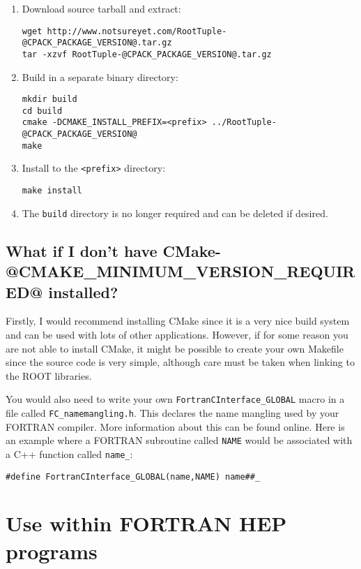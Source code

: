 \documentclass[a4paper,12pt]{article}
\begin{document}
\begin{enumerate}
    \item Download source tarball and extract:\begin{verbatim}
wget http://www.notsureyet.com/RootTuple-@CPACK_PACKAGE_VERSION@.tar.gz
tar -xzvf RootTuple-@CPACK_PACKAGE_VERSION@.tar.gz\end{verbatim}
    \item Build in a separate binary directory:\begin{verbatim}
mkdir build
cd build
cmake -DCMAKE_INSTALL_PREFIX=<prefix> ../RootTuple-@CPACK_PACKAGE_VERSION@
make\end{verbatim}
    \item Install to the \verb|<prefix>| directory:\begin{verbatim}
make install\end{verbatim}
    \item The \verb|build| directory is no longer required and can be deleted if desired.
\end{enumerate}

\subsection{What if I don't have CMake-@CMAKE_MINIMUM_VERSION_REQUIRED@ installed?}
Firstly, I would recommend installing CMake since it is a very nice build system and can be used with lots of other applications. However, if for some reason you are not able to install CMake, it might be possible to create your own Makefile since the source code is very simple, although care must be taken when linking to the ROOT libraries.

You would also need to write your own \verb|FortranCInterface_GLOBAL| macro in a file called \verb|FC_namemangling.h|. This declares the name mangling used by your FORTRAN compiler. More information about this can be found online. Here is an example where a FORTRAN subroutine called \verb|NAME| would be associated with a C++ function called \verb|name_|:
\begin{verbatim}
#define FortranCInterface_GLOBAL(name,NAME) name##_\end{verbatim}

\section{Use within FORTRAN HEP programs}
\label{sec:usage}
\end{document}
